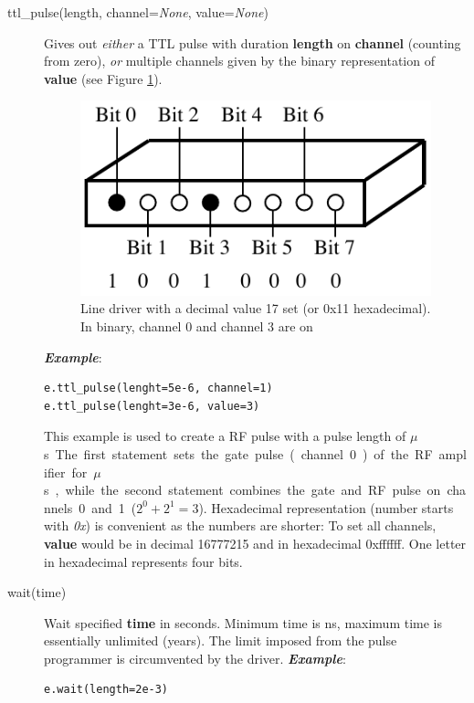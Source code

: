 \documentclass[12pt, a4paper, BCOR10mm, twoside, titlepage, headinclude]{scrbook}
\begin{document}
\begin{description}
\item[ttl\_pulse(length, channel=\textit{None}, value=\textit{None})]
Gives out \emph{either} a \textsf{TTL} pulse with duration \textbf{length} on \textbf{channel} (counting from zero), \emph{or} multiple channels given by the binary representation of \textbf{value} (see Figure \ref{binary}).
\begin{figure}
\centering
\includegraphics[]{pins_ttl_bit}
\caption{Line driver with a decimal value 17 set (or 0x11 hexadecimal). In binary, channel 0 and channel 3 are on}
\label{binary}
\end{figure}
\newline
\emph{\textbf{Example}}:
\begin{lstlisting}
e.ttl_pulse(lenght=5e-6, channel=1)
e.ttl_pulse(lenght=3e-6, value=3)
\end{lstlisting}
This example is used to create a RF pulse with a pulse length of \unit[3]{$\mu$s}. The first statement sets the gate pulse (channel 0) of the RF amplifier for \unit[5]{$\mu$s}, while the second  statement combines the gate and RF pulse on channels 0 and 1 ($2^0 + 2^1 = 3$). Hexadecimal representation (number starts with \emph{0x}) is convenient as the numbers are shorter: To set all channels, \textbf{value} would be in decimal 16777215 and in hexadecimal 0xffffff. One letter in hexadecimal represents four bits.
\item[wait(time)]
Wait specified \textbf{time} in seconds. Minimum time is \unit[90]{ns}, maximum time is essentially  unlimited (years). The limit imposed from the pulse programmer is circumvented by the driver.
\newline
\emph{\textbf{Example}}:
\begin{lstlisting}
e.wait(length=2e-3)
\end{lstlisting}


\end{description}
\end{document}
